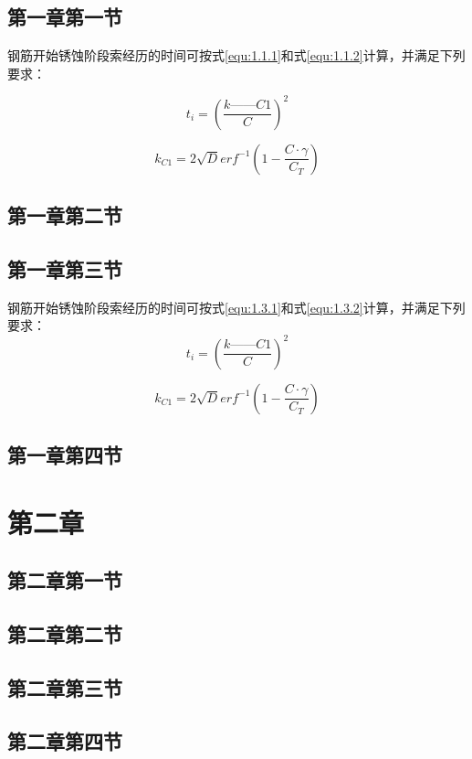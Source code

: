 \documentclass[12pt,oneside,a4paper]{book}%
\begin{document}
\section{第一章第一节}
钢筋开始锈蚀阶段索经历的时间可按式\ref{equ:1.1.1}和式\ref{equ:1.1.2}计算，并满足下列要求：

\begin{equation}\label{equ:1.1.1}　
t_{i}=(\frac{k——{C1}}{C})^{2}
\end{equation}

\begin{equation}\label{equ:1.1.2}　
	k_{C1}=2\sqrt{D}erf^{-1}(1-\dfrac{C\cdot\gamma}{C_{T}})
\end{equation}

\section{第一章第二节}
\section{第一章第三节}

钢筋开始锈蚀阶段索经历的时间可按式\ref{equ:1.3.1}和式\ref{equ:1.3.2}计算，并满足下列要求：
\begin{equation}\label{equ:1.3.1}　
	t_{i}=(\frac{k——{C1}}{C})^{2}
\end{equation}

\begin{equation}\label{equ:1.3.2}　
	k_{C1}=2\sqrt{D}erf^{-1}(1-\dfrac{C\cdot\gamma}{C_{T}})
\end{equation}
\section{第一章第四节}
\chapter{第二章}
\section{第二章第一节}
\section{第二章第二节}
\section{第二章第三节}
\section{第二章第四节}
\end{document}
